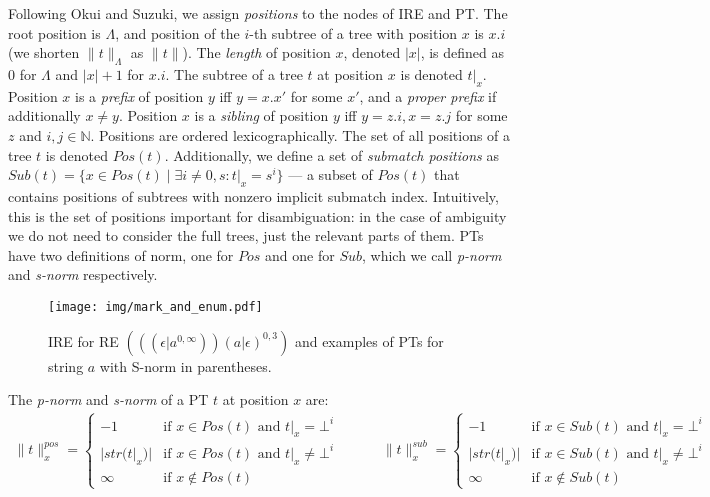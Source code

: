 \documentclass[AMA,STIX1COL]{WileyNJD-v2}
\newcommand{\YN}{\mathbb{N}}
\newcommand{\pnorm}[2]{\|{#1}\|^{pos}_{#2}}
\newcommand{\snorm}[2]{\|{#1}\|^{sub}_{#2}}
\begin{document}
Following Okui and Suzuki, we assign \emph{positions} to the nodes of IRE and PT.
The root position is $\Lambda$, and position of the $i$-th subtree of a tree with position $x$ is $x.i$
(we shorten $\|t\|_\Lambda$ as $\|t\|$).
The \emph{length} of position $x$, denoted $|x|$, is defined as $0$ for $\Lambda$ and $|x| + 1$ for $x.i$.
The subtree of a tree $t$ at position $x$ is denoted $t|_x$.
Position $x$ is a \emph{prefix} of position $y$ iff $y = x.x'$ for some $x'$,
and a \emph{proper prefix} if additionally $x \neq y$.
Position $x$ is a \emph{sibling} of position $y$ iff $y = z.i, x = z.j$ for some $z$ and $i,j \in \YN$.
Positions are ordered lexicographically.
The set of all positions of a tree $t$ is denoted $Pos(t)$.
Additionally, we define a set of \emph{submatch positions} as
$Sub(t) = \big\{ x \in Pos(t) \mid \exists i \neq 0, s: t|_x = s^i\big\}$ ---
a subset of $Pos(t)$ that contains positions of subtrees with nonzero implicit submatch index.
Intuitively, this is the set of positions important for disambiguation:
in the case of ambiguity we do not need to consider the full trees,
just the relevant parts of them.
%
PTs have two definitions of norm, one for $Pos$ and one for $Sub$,
which we call \emph{p-norm} and \emph{s-norm} respectively.

\begin{figure}[t!]
\texttt{[image: img/mark\_and\_enum.pdf]}
\vspace{-1em}
\caption{
IRE for RE $(((\epsilon|a^{0,\infty}))(a|\epsilon)^{0,3})$
and examples of PTs for string $a$
with S-norm in parentheses.
}\label{fig:mark_and_enum}
\end{figure}

\FloatBarrier

    \begin{definition}\label{tnorm_of_PTs}
    The \emph{p-norm} and \emph{s-norm} of a PT $t$ at position $x$ are:
    \begin{align*}
        \pnorm{t}{x} =
            \begin{cases}
                -1          &\text{if } x \in Pos(t) \text{ and } t|_x = \bot^i  \\[-0.2em]
                |str(t|_x)| &\text{if } x \in Pos(t) \text{ and } t|_x \neq \bot^i \\[-0.2em]
                \infty      &\text{if } x \not\in Pos(t)
            \end{cases}
    \quad\quad\quad
        \snorm{t}{x} =
            \begin{cases}
                -1          &\text{if } x \in Sub(t) \text{ and } t|_x = \bot^i  \\[-0.2em]
                |str(t|_x)| &\text{if } x \in Sub(t) \text{ and } t|_x \neq \bot^i \\[-0.2em]
                \infty      &\text{if } x \not\in Sub(t)
            \end{cases}
    \end{align*}
    \end{definition}
\end{document}
